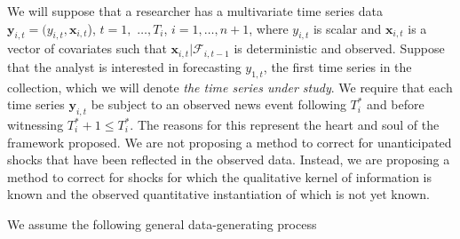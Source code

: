 \documentclass{uiucthesis2021}
\newcommand{\y}{\textbf{y}}
\newcommand{\x}{\textbf{x}}
\theoremstyle{definition}
\begin{document}
We will suppose that a researcher has a multivariate time series data $\y_{i,t} = (y_{i,t}, \x_{i,t}$), $t = 1,$ $\ldots,  T_i$, $i = 1, \ldots, n+1$, where $y_{i,t}$ is scalar and $\x_{i,t}$ is a vector of covariates such that $\x_{i,t}|\mathcal{F}_{i,t-1}$ is deterministic and observed.  Suppose that the analyst is interested in forecasting $y_{1,t}$, the first time series in the collection, which we will denote \textit{the time series under study}.   We require that each time series $\y_{i,t}$ be subject to an observed news event following $T^*_i$ and before witnessing $T^*_i+1 \leq T_{i}^{*}$.  The reasons for this represent the heart and soul of the framework proposed.  We are not proposing a method to correct for unanticipated shocks that have been reflected in the observed data.  Instead, we are proposing a method to correct for shocks for which the qualitative kernel of information is known and the observed quantitative instantiation of which is not yet known. 

We assume the following general data-generating process
\end{document}
